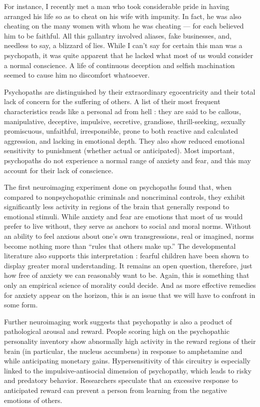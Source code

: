 \documentclass[a4paper,14pt]{extbook}
\begin{document}
For instance, I recently met a man who took considerable pride in having arranged his life so as to cheat on his wife with impunity.
In fact, he was also cheating on the many women with whom he was cheating --- for each believed him to be faithful.
All this gallantry involved aliases, fake businesses, and, needless to say, a blizzard of lies.
While I can’t say for certain this man was a psychopath, it was quite apparent that he lacked what most of us would consider a normal conscience.
A life of continuous deception and selfish machination seemed to cause him no discomfort whatsoever.

Psychopaths are distinguished by their extraordinary egocentricity and their total lack of concern for the suffering of others.
A list of their most frequent characteristics reads like a personal ad from hell :
they are said to be callous, manipulative, deceptive, impulsive, secretive, grandiose, thrill-seeking, sexually promiscuous, unfaithful, irresponsible, prone to both reactive and calculated aggression, and lacking in emotional depth.
They also show reduced emotional sensitivity to punishment (whether actual or anticipated).
Most important, psychopaths do not experience a normal range of anxiety and fear, and this may account for their lack of conscience.

The first neuroimaging experiment done on psychopaths found that, when compared to nonpsychopathic criminals and noncriminal controls, they exhibit significantly less activity in regions of the brain that generally respond to emotional stimuli.
While anxiety and fear are emotions that most of us would prefer to live without, they serve as anchors to social and moral norms.
Without an ability to feel anxious about one’s own transgressions, real or imagined, norms become nothing more than ``rules that others make up.''
The developmental literature also supports this interpretation :
fearful children have been shown to display greater moral understanding.
It remains an open question, therefore, just how free of anxiety we can reasonably want to be.
Again, this is something that only an empirical science of morality could decide.
And as more effective remedies for anxiety appear on the horizon, this is an issue that we will have to confront in some form.

Further neuroimaging work suggests that psychopathy is also a product of pathological arousal and reward.
People scoring high on the psychopathic personality inventory show abnormally high activity in the reward regions of their brain (in particular, the nucleus accumbens) in response to amphetamine and while anticipating monetary gains.
Hypersensitivity of this circuitry is especially linked to the impulsive-antisocial dimension of psychopathy, which leads to risky and predatory behavior.
Researchers speculate that an excessive response to anticipated reward can prevent a person from learning from the negative emotions of others.
\end{document}

